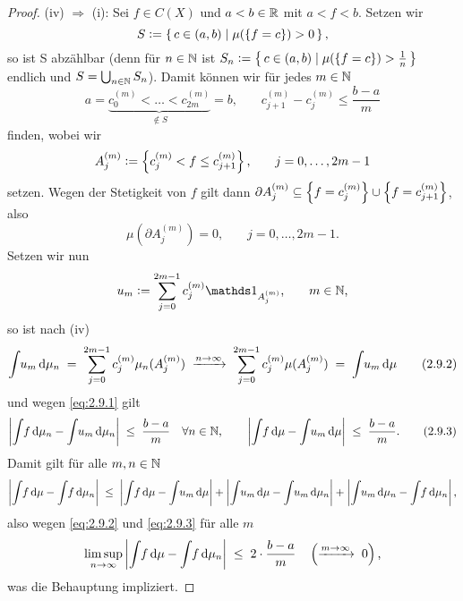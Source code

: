 \documentclass[../main/main.tex]{subfiles}
\begin{document}
\begin{proof}
		(iv) $\Rightarrow$ (i): Sei $f \in C(X)$ und $a < b \in \mathbb{R}$ 
		mit $a < f < b$. Setzen wir
		$$S \vcentcolon = \left\{\, c \in (a, b) \; | \; \mu(\left\{f = c\right\}) > 0 \,\right\} \text{,}$$
		so ist S abzählbar (denn für $n \in \mathbb{N}$ ist 
		$S_n \vcentcolon = \left\{\, c \in (a, b) \; | \; \mu(\left\{f = c\right\}) > \frac{1}{n} \,\right\}$ 
		endlich und $S = \bigcup_{n \in \mathbb{N}} S_n$).
		Damit können wir für jedes $m \in \mathbb{N}$ 
		\[a = \underbrace{c_0^{(m)} < \dots < c_{2m}^{(m)}}_{\notin S} = 
			b \text{,} \qquad c_{j+1}^{(m)} - c_j^{(m)} \leq \frac{b-a}{m} 
			\label{eq:2.9.1} \tag{2.9.1}\]
		finden, wobei wir
		$$A_j^{(m)} \vcentcolon = \left\{c_j^{(m)} < f \leq c_{j+1}^{(m)}\right\}\text{,}
			 \qquad j = 0,\dots,2m-1$$
		setzen. 
		Wegen der Stetigkeit von $f$ gilt dann 
		$\partial A_j^{(m)} \subseteq \left\{f = c_j^{(m)}\right\} \cup \left\{f = c_{j+1}^{(m)}\right\}$, 
		also 
		$$\mu(\partial A_j^{(m)}) = 0 \text{,} \qquad j = 0,\dots,2m-1 \text{.}$$
		Setzen wir nun
		$$u_m \defby \sum_{j=0}^{2m-1} c_j^{(m)} \indfct_{A_j^{(m)}} 
			\text{,} \qquad m \in \N \text{,}$$
		so ist nach (iv)
		\[\int_{} \, u_m \, \mathrm{d}\mu_n \; = \; \sum_{j=0}^{2m-1} c_j^{(m)} \mu_n(A_j^{(m)}) 
			\; \xrightarrow{n \to \infty} \; \sum_{j=0}^{2m-1} c_j^{(m)} \mu(A_j^{(m)}) \; = \; 
			\int_{} \, u_m \, \mathrm{d}\mu \label{eq:2.9.2} \tag{2.9.2}\]
		und wegen \eqref{eq:2.9.1} gilt
		\[\left| \int_{} \, f \, \mathrm{d}\mu_n - \int_{} \, u_m \, \mathrm{d}\mu_n \right| \; \leq \; 
			\frac{b-a}{m} \quad \forall n \in \mathbb{N} \text{,} \qquad 
			\left| \int_{} \, f \, \mathrm{d}\mu - \int_{} \, u_m \, \mathrm{d}\mu \right| \; \leq \; 
			\frac{b-a}{m} \text{.} \label{eq:2.9.3} \tag{2.9.3}\]
		Damit gilt für alle $m, n \in \mathbb{N}$
		$$ \left| \int_{} \, f \, \mathrm{d}\mu - \int_{} \, f \, \mathrm{d}\mu_n \right| \; \leq \; 
			\left| \int_{} \, f \, \mathrm{d}\mu - \int_{} \, u_m \, \mathrm{d}\mu \right| + 
			\left| \int_{} \, u_m \, \mathrm{d}\mu - \int_{} \, u_m \, \mathrm{d}\mu_n \right| + 
			\left| \int_{} \, u_m \, \mathrm{d}\mu_n - \int_{} \, f \, \mathrm{d}\mu_n \right| \text{,}$$
		also wegen \eqref{eq:2.9.2} und \eqref{eq:2.9.3} für alle $m$
		$$ \limsup_{n \to \infty} \left| \int_{} \, f \, \mathrm{d}\mu - \int_{} \, f \, \mathrm{d}\mu_n \right|
			 \; \leq \; 2 \cdot \frac{b-a}{m} \quad 
			 \left(\xrightarrow{m \to \infty} \; 0\right) \text{,}$$
		was die Behauptung impliziert.
	\end{proof}

	
	
\end{document}
